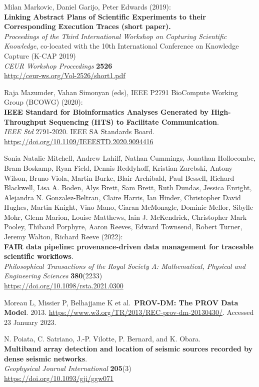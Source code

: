 \documentclass[10pt,letterpaper]{article}
\begin{document}
\begin{thebibliography}{10}
 Milan Markovic, Daniel Garijo, Peter Edwards
(2019):\\
\textbf{Linking Abstract Plans of Scientific Experiments to their
Corresponding Execution Traces (short paper).}\\
\emph{Proceedings of the Third International Workshop on Capturing
Scientific Knowledge}, co-located with the 10th International Conference
on Knowledge Capture (K-CAP 2019)\\
\emph{CEUR Workshop Proceedings} \textbf{2526}\\
\url{http://ceur-ws.org/Vol-2526/short1.pdf}

 Raja Mazumder, Vahan Simonyan (eds), IEEE P2791
BioCompute Working Group (BCOWG) (2020):\\
\textbf{IEEE Standard for Bioinformatics Analyses Generated by
High-Throughput Sequencing (HTS) to Facilitate Communication}.\\
\emph{IEEE Std} 2791-2020. IEEE SA Standards Board.\\
\url{https://doi.org/10.1109/IEEESTD.2020.9094416}

 Sonia Natalie Mitchell, Andrew Lahiff, Nathan
Cummings, Jonathan Hollocombe, Bram Boskamp, Ryan Field, Dennis
Reddyhoff, Kristian Zarebski, Antony Wilson, Bruno Viola, Martin Burke,
Blair Archibald, Paul Bessell, Richard Blackwell, Lisa A. Boden, Alys
Brett, Sam Brett, Ruth Dundas, Jessica Enright, Alejandra N.
Gonzalez-Beltran, Claire Harris, Ian Hinder, Christopher David Hughes,
Martin Knight, Vino Mano, Ciaran McMonagle, Dominic Mellor, Sibylle
Mohr, Glenn Marion, Louise Matthews, Iain J. McKendrick, Christopher
Mark Pooley, Thibaud Porphyre, Aaron Reeves, Edward Townsend, Robert
Turner, Jeremy Walton, Richard Reeve (2022):\\
\textbf{FAIR data pipeline: provenance-driven data management for
traceable scientific workflows}.\\
\emph{Philosophical Transactions of the Royal Society A: Mathematical,
Physical and Engineering Sciences} \textbf{380}(2233)\\
\url{https://doi.org/10.1098/rsta.2021.0300}

 Moreau L, Missier P, Belhajjame K et
al.~\textbf{PROV-DM: The PROV Data Model}. 2013.
\url{https://www.w3.org/TR/2013/REC-prov-dm-20130430/}.
Accessed 23 January 2023.

 N. Poiata, C. Satriano, J.-P. Vilotte, P. Bernard, and
K. Obara.\\
\textbf{Multiband array detection and location of seismic sources
recorded by dense seismic networks}.\\
\emph{Geophysical Journal International} \textbf{205}(3)\\
\url{https://doi.org/10.1093/gji/ggw071}


\end{thebibliography}
\end{document}
